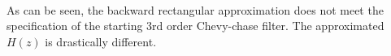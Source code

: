 \documentclass[11pt]{article}
\begin{document}
    \begin{center}
    \end{center}
    { \hspace*{\fill} \\}
    
    As can be seen, the backward rectangular approximation does not meet the
specification of the starting 3rd order Chevy-chase filter. The
approximated \(H(z)\) is drastically different.


    
    
    
    
\end{document}
